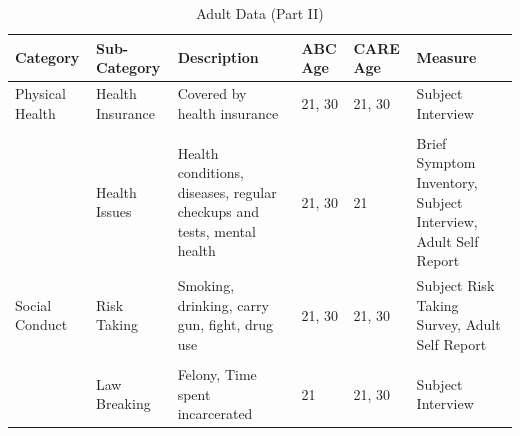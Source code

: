\documentclass[static]{JJH-Beamer}
\begin{document}
\begin{frame}
 \addtocounter{framenumber}{-1}

\begin{table}[H]
\caption{Adult Data (Part II)} \label{tab:adultvars_2}
\begin{center}
\begin{tiny}
\begin{tabular}{L{1.1cm} C{1.4cm} C{2.5cm} C{.8cm} C{.8cm} C{3cm}}
\toprule
\textbf{Category}	&	\textbf{Sub-Category}	&	\textbf{Description}	&	\textbf{ABC Age}  	&  \textbf{CARE Age}  & 	\textbf{Measure}	\\ \midrule
Physical Health	&	Health Insurance	&	Covered by health insurance	&	21, 30	&	21, 30	&	Subject Interview	\\
\\											
	&	Health Issues	&	Health conditions, diseases, regular checkups and tests, mental health	&	21, 30	&	21	&	Brief Symptom Inventory, Subject Interview, Adult Self Report	\\
\midrule											
Social Conduct	&	Risk Taking	&	Smoking, drinking, carry gun, fight, drug use	&	21, 30	&	21, 30	&	Subject Risk Taking Survey, Adult Self Report	\\
\\											
	&	Law Breaking	&	Felony, Time spent incarcerated	&	21	&	21, 30	& Subject Interview	\\
 \bottomrule
\end{tabular}										
\end{tiny}
\end{center}															
\end{table}

\end{frame}
\end{document}
